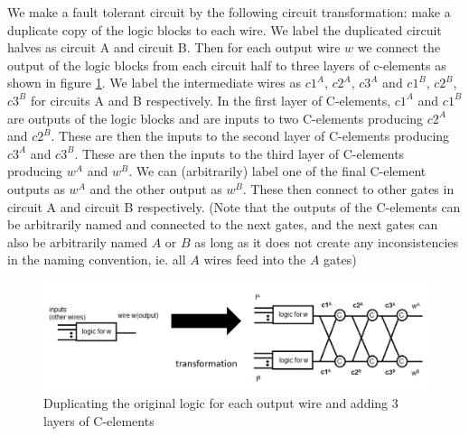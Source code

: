 \documentclass[12pt]{report}
\begin{document}
We make a fault tolerant circuit by the following circuit transformation: make a duplicate copy of the logic blocks to each wire.  We label the duplicated circuit halves as circuit A and circuit B.  Then for each output wire $w$ we connect the output of the logic blocks from each circuit half to three layers of c-elements as shown in figure \ref{fig:dupscheme}.  We label the intermediate wires as $c1^A$, $c2^A$, $c3^A$ and $c1^B$, $c2^B$, $c3^B$ for circuits A and B respectively.  In the first layer of C-elements, $c1^A$ and $c1^B$ are outputs of the logic blocks and are inputs to two C-elements producing $c2^A$ and $c2^B$.  These are then the inputs to the second layer of C-elements producing $c3^A$ and $c3^B$.  These are then the inputs to the third layer of C-elements producing $w^A$ and $w^B$.  We can (arbitrarily) label one of the final C-element outputs as $w^A$ and the other output as $w^B$.  These then connect to other gates in circuit A and circuit B respectively.  (Note that the outputs of the C-elements can be arbitrarily named and connected to the next gates, and the next gates can also be arbitrarily named $A$ or $B$ as long as it does not create any inconsistencies in the naming convention, ie. all $A$ wires feed into the $A$ gates)  %
\begin{figure}
  \centering
    \includegraphics[width=\textwidth]{circuitforproof3}
  \caption{Duplicating the original logic for each output wire and adding 3 layers of C-elements}
  \label{fig:dupscheme}
\end{figure}
\end{document}
